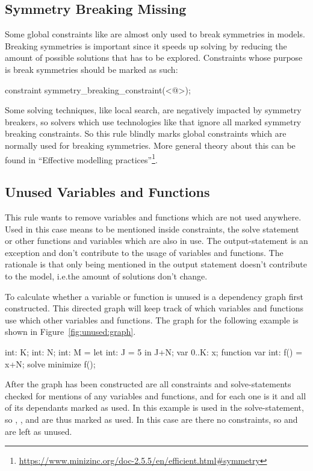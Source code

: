 \documentclass[a4paper,12pt]{article}
\newcommand{\mi}[1]{\mbox{\mzninline{#1}}}
\begin{document}
\subsection{Symmetry Breaking Missing}\label{sec:rule:symbreak}
Some global constraints like \mi{value_precede_chain} are almost only used to break
symmetries in models. Breaking symmetries is important since it speeds up solving by
reducing the amount of possible solutions that has to be explored. Constraints whose
purpose is break symmetries should be marked as such:
\begin{mznnobreak}
constraint symmetry_breaking_constraint(<@\dots@>);
\end{mznnobreak}
Some solving techniques, like local search, are negatively impacted
by symmetry breakers, so solvers which use technologies like that ignore all marked
symmetry breaking constraints. So this rule blindly marks global constraints which are
normally used for breaking symmetries. More general theory about this can be found in
``Effective modelling practices''\footnote{\url{https://www.minizinc.org/doc-2.5.5/en/efficient.html\#symmetry}}.

\subsection{Unused Variables and Functions}\label{sec:rule:unused}
This rule wants to remove variables and functions which are not used anywhere.
Used in this case means to be mentioned inside constraints, the solve statement or other
functions and variables which are also in use. The output-statement is an exception and
don't contribute to the usage of variables and functions. The rationale is that only being
mentioned in the output statement doesn't contribute to the model, i.e.\@ the amount of
solutions don't change.

To calculate whether a variable or function is unused is a dependency graph first
constructed. This directed graph will keep track of which variables and functions use
which other variables and functions. The graph for the following example is shown in
Figure~\ref{fig:unused:graph}.

\begin{mznnobreak}
int: K; int: N;
int: M = let {int: J = 5} in J+N;
var 0..K: x;
function var int: f() = x+N;
solve minimize f();
\end{mznnobreak}



After the graph has been constructed are all constraints and solve-statements checked for
mentions of any variables and functions, and for each one is it and all of its
dependants marked as used. In this example is \mi{f} used in the solve-statement, so
\mi{f}, \mi{N}, \mi{x} and \mi{K} are thus marked as used. In this case are there no
constraints, so \mi{J} and \mi{M} are left as unused.
\end{document}
